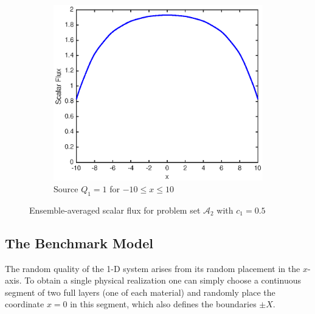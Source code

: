 \documentclass[12pt]{article}
\newcommand{\seta}{\mathcal{A}}
\begin{document}
{\begin{figure}[hbt]
\begin{subfigure}{0.495\textwidth}
    \end{subfigure}
    \hfill
    \begin{subfigure}{0.495\textwidth}
        \centering
        \includegraphics[width=\textwidth]{fig3b.eps}
        \caption{Source $Q_1=1$ for $-10\leq x\leq 10$}
        \label{fig3b}
    \end{subfigure}
    \caption{Ensemble-averaged scalar flux for problem set {$\seta_2$} with $c_1=0.5$}
    \label{fig3}
\end{figure}

\subsection{The Benchmark Model}

The random quality of the 1-D system arises from its random placement in the $x$-axis.
To obtain a single physical realization one can simply choose a continuous segment of two full layers (one of each material) and randomly place the coordinate $x=0$ in this segment, which also defines the boundaries $\pm X$.

}
\end{document}
